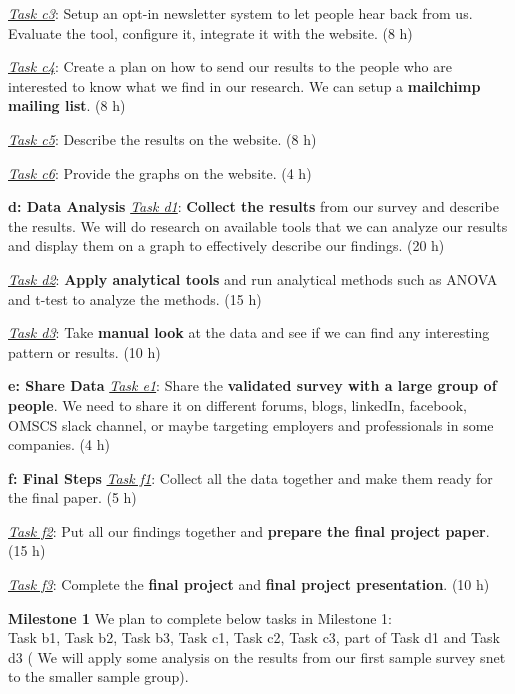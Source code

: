 \documentclass{sigchi}
\begin{document}
\textit{\underline{Task c3}}: Setup an opt-in newsletter system to let people hear back from us. Evaluate the tool, 
configure it, integrate it with the website. (8 h)

\textit{\underline{Task c4}}: Create a plan on how to send our results to the people who are interested to know what we find in our research. We can setup a \textbf{mailchimp mailing list}. (8 h)

\textit{\underline{Task c5}}:  Describe the results on the website. (8 h)

\textit{\underline{Task c6}}: Provide the graphs on the website. (4 h)\newline

\textbf{d: Data Analysis}\newline
\textit{\underline{Task d1}}: \textbf{Collect the results} from our survey and describe the results. We will do research on available tools that we can analyze our results and display them on a graph to effectively describe our findings. (20 h)

\textit{\underline{Task d2}}: \textbf{Apply analytical tools} and run analytical methods such as ANOVA and t-test to analyze the methods. (15 h)

\textit{\underline{Task d3}}: Take \textbf{manual look} at the data and see if we can find any interesting pattern or results. (10 h)\newline

\textbf{e: Share Data}\newline
\textit{\underline{Task e1}}: Share the \textbf{validated survey with a large group of people}. We need to share it on different forums, blogs, linkedIn, facebook, OMSCS slack channel, or maybe targeting employers and professionals in some companies. (4 h)\newline

\textbf{f: Final Steps}\newline
\textit{\underline{Task f1}}: Collect all the data together and make them ready for the final paper. (5 h)

\textit{\underline{Task f2}}: Put all our findings together and \textbf{prepare the final project paper}. (15 h)

\textit{\underline{Task f3}}: Complete the \textbf{final project} and \textbf{final project presentation}.  (10 h)\newline

\textbf{Milestone 1}\newline
We plan to complete below tasks in Milestone 1:\\
Task b1, Task b2, Task b3, Task c1, Task c2, Task c3, part of Task d1 and Task d3 ( We will apply some analysis on the results from our first sample survey snet to the smaller sample group).
\end{document}
